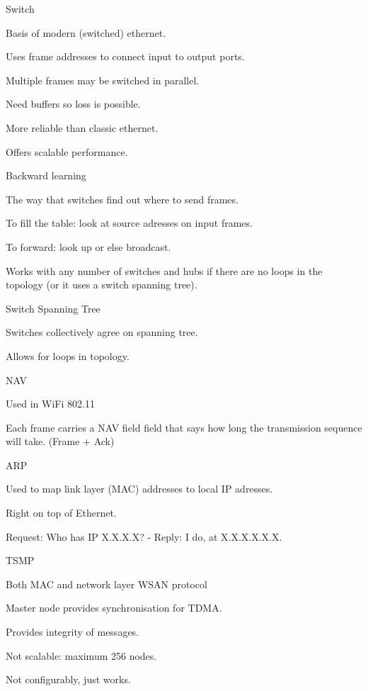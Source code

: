 \documentclass[main.tex]{subfiles}
\begin{document}
\begin{card}{Switch}
\item Basis of modern (switched) ethernet.
\item Uses frame addresses to connect input to output ports.
\item Multiple frames may be switched in parallel.
\item Need buffers so loss is possible.
\item More reliable than classic ethernet.
\item Offers scalable performance.
\end{card}

\begin{card}{Backward learning}
\item The way that switches find out where to send frames.
\item To fill the table: look at source adresses on input frames.
\item To forward: look up or else broadcast.
\item Works with any number of switches and hubs if there are no loops in the topology (or it uses a switch spanning tree).
\end{card}

\begin{card}{Switch Spanning Tree}
\item Switches collectively agree on spanning tree.
\item Allows for loops in topology.
\end{card}

\begin{card}{NAV}
\item Used in WiFi 802.11
\item Each frame carries a NAV field field that says how long the transmission sequence will take. (Frame + Ack)
\end{card}

\begin{card}{ARP}
\item Used to map link layer (MAC) addresses to local IP adresses.
\item Right on top of Ethernet.
\item Request: Who has IP X.X.X.X? - Reply: I do, at X.X.X.X.X.X.
\end{card}

\begin{card}{TSMP}
\item Both MAC and network layer WSAN protocol
\item Master node provides synchronisation for TDMA.
\item Provides integrity of messages.
\item Not scalable: maximum 256 nodes.
\item Not configurably, just works.
\end{card}
\end{document}
